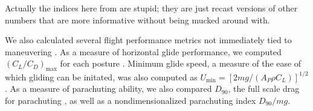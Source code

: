 Actually the indices here from \citep{Emerson:1990b, McCay:2001, McCay:2001a} are stupid; they are just recast versions of other numbers that are more informative without being mucked around with. 

We also calculated several flight performance metrics not immediately tied to maneuvering \citep{McCay:2001, McCay:2001a, Emerson:1990, Emerson:1990b}. As a measure of horizontal glide performance, we computed $(C_L/C_D)_{\mbox{max}}$ for each posture \citep{Emerson:1990b}. Minimum glide speed, a measure of the ease of which gliding can be initated, was also computed as $U_{\mbox{min}} = [2mg /(A_P \rho C_L)]^{1/2}$ \citep{Emerson:1990b}. As a measure of parachuting ability, we also compared $D_{90}$, the full scale drag for parachuting \citep{Emerson:1990b}, as well as a nondimensionalized parachuting index $D_{90}/mg$.  









